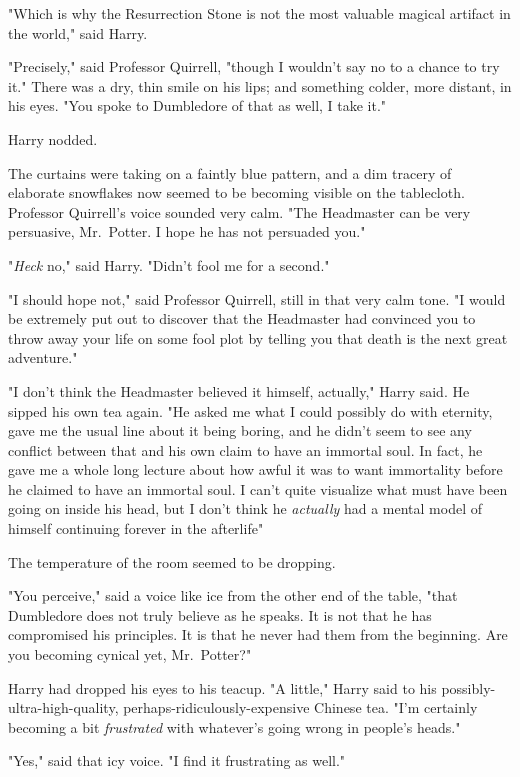 "Which is why the Resurrection Stone is not the most valuable magical artifact
in the world," said Harry.

"Precisely," said Professor Quirrell, "though I wouldn't say no to a chance to
try it." There was a dry, thin smile on his lips; and something colder, more
distant, in his eyes. "You spoke to Dumbledore of that as well, I take it."

Harry nodded.

The curtains were taking on a faintly blue pattern, and a dim tracery of
elaborate snowflakes now seemed to be becoming visible on the tablecloth.
Professor Quirrell's voice sounded very calm. "The Headmaster can be very
persuasive, Mr.~Potter. I hope he has not persuaded you."

"\emph{Heck} no," said Harry. "Didn't fool me for a second."

"I should hope not," said Professor Quirrell, still in that very calm tone. "I
would be extremely put out to discover that the Headmaster had convinced you to
throw away your life on some fool plot by telling you that death is the next
great adventure."

"I don't think the Headmaster believed it himself, actually," Harry said. He
sipped his own tea again. "He asked me what I could possibly do with eternity,
gave me the usual line about it being boring, and he didn't seem to see any
conflict between that and his own claim to have an immortal soul. In fact, he
gave me a whole long lecture about how awful it was to want immortality before
he claimed to have an immortal soul. I can't quite visualize what must have
been going on inside his head, but I don't think he \emph{actually} had a
mental model of himself continuing forever in the afterlife{\el}"

The temperature of the room seemed to be dropping.

"You perceive," said a voice like ice from the other end of the table, "that
Dumbledore does not truly believe as he speaks. It is not that he has
compromised his principles. It is that he never had them from the beginning.
Are you becoming cynical yet, Mr.~Potter?"

Harry had dropped his eyes to his teacup. "A little," Harry said to his
possibly-ultra-high-quality, perhaps-ridiculously-expensive Chinese tea. "I'm
certainly becoming a bit \emph{frustrated} with{\el} whatever's going wrong
in people's heads."

"Yes," said that icy voice. "I find it frustrating as well."

